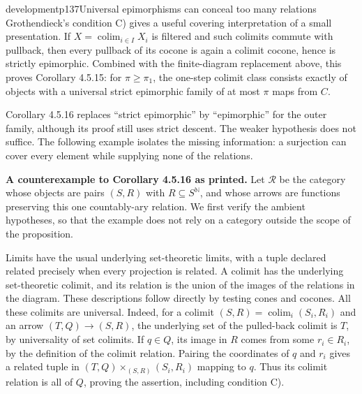\begin{dcomment}{development}{p137}{Universal epimorphisms can conceal too many relations}
Grothendieck's condition C) gives a useful covering interpretation of a small presentation. If $X=\operatorname{colim}_{i\in I}X_i$ is filtered and such colimits commute with pullback, then every pullback of its cocone is again a colimit cocone, hence is strictly epimorphic. Combined with the finite-diagram replacement above, this proves Corollary 4.5.15: for $\pi\geq\pi_1$, the one-step colimit class consists exactly of objects with a universal strict epimorphic family of at most $\pi$ maps from $C$.

Corollary 4.5.16 replaces ``strict epimorphic'' by ``epimorphic'' for the outer family, although its proof still uses strict descent. The weaker hypothesis does not suffice. The following example isolates the missing information: a surjection can cover every element while supplying none of the relations.

\textbf{A counterexample to Corollary 4.5.16 as printed.}\ours{}
Let $\mathcal R$ be the category whose objects are pairs $(S,R)$ with $R\subseteq S^{\mathbb N}$, and whose arrows are functions preserving this one countably-ary relation. We first verify the ambient hypotheses, so that the example does not rely on a category outside the scope of the proposition.

Limits have the usual underlying set-theoretic limits, with a tuple declared related precisely when every projection is related. A colimit has the underlying set-theoretic colimit, and its relation is the union of the images of the relations in the diagram. These descriptions follow directly by testing cones and cocones. All these colimits are universal. Indeed, for a colimit $(S,R)=\operatorname{colim}_i(S_i,R_i)$ and an arrow $(T,Q)\to(S,R)$, the underlying set of the pulled-back colimit is $T$, by universality of set colimits. If $q\in Q$, its image in $R$ comes from some $r_i\in R_i$, by the definition of the colimit relation. Pairing the coordinates of $q$ and $r_i$ gives a related tuple in $(T,Q)\times_{(S,R)}(S_i,R_i)$ mapping to $q$. Thus its colimit relation is all of $Q$, proving the assertion, including condition C).


\end{dcomment}
